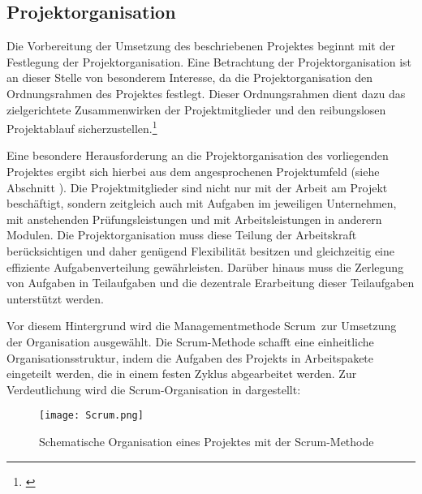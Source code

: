 \subsection{Projektorganisation}
\label{sec:Projektorganisation}

Die Vorbereitung der Umsetzung des beschriebenen Projektes beginnt mit der Festlegung der Projektorganisation.
Eine Betrachtung der Projektorganisation ist an dieser Stelle von besonderem Interesse, da die Projektorganisation
den Ordnungsrahmen des Projektes festlegt.
Dieser Ordnungsrahmen dient dazu das zielgerichtete Zusammenwirken
der Projektmitglieder und den reibungslosen Projektablauf sicherzustellen.\footnote{\citet[S.~15]{geiger2009}}

Eine besondere Herausforderung an die Projektorganisation des vorliegenden Projektes ergibt sich hierbei
aus dem angesprochenen Projektumfeld (siehe Abschnitt ). Die Projektmitglieder sind
nicht nur mit der Arbeit am Projekt beschäftigt, sondern zeitgleich auch mit Aufgaben im jeweiligen
Unternehmen, mit anstehenden Prüfungsleistungen und mit Arbeitsleistungen in anderern Modulen.
Die Projektorganisation muss diese Teilung der Arbeitskraft berücksichtigen und daher genügend Flexibilität
besitzen und gleichzeitig eine effiziente Aufgabenverteilung gewährleisten. Darüber hinaus muss
die Zerlegung von Aufgaben in Teilaufgaben und die dezentrale Erarbeitung dieser Teilaufgaben unterstützt werden.

Vor diesem Hintergrund wird die Managementmethode Scrum\footnotemark\ zur Umsetzung der Organisation ausgewählt.
Die Scrum-Methode schafft eine einheitliche Organisationsstruktur, 
indem die Aufgaben des Projekts in Arbeitspakete eingeteilt werden,
die in einem festen Zyklus abgearbeitet werden. Zur Verdeutlichung wird die Scrum-Organisation in 
dargestellt:


\clearpage
\begin{figure}[htb] 
\centering
\texttt{[image: Scrum.png]}
\caption[Scrum-Organisation]{Schematische Organisation eines Projektes mit der Scrum-Methode\protect\footnotemark}
\label{fig:Scrum}
\end{figure}

